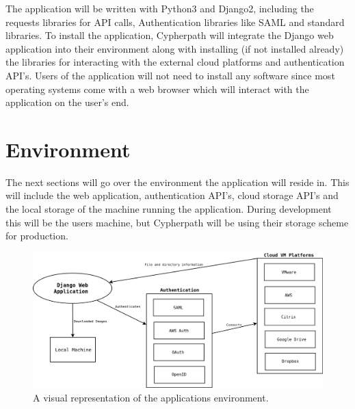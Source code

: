 \documentclass{article}
\begin{document}
    The application will be written with Python3 and Django2, including the requests libraries for API calls, Authentication libraries like SAML
    and standard libraries. To install the application, Cypherpath will integrate the Django web application into their environment along with installing (if not installed already)
    the libraries for interacting with the external cloud platforms and authentication API's. Users of the application will not need to install any software since most operating systems come
    with a web browser which will interact with the application on the user's end.


	
    \section{Environment}
    The next sections will go over the environment the application will reside in. This will include the web application, authentication API's, cloud storage API's and the local storage
    of the machine running the application. During development this will be the users machine, but Cypherpath will be using their storage scheme for production.
	
    \begin{figure}[h]
    \includegraphics[scale=.4]{downloader_env}
        \caption{A visual representation of the applications environment.}
    \end{figure}
\end{document}
